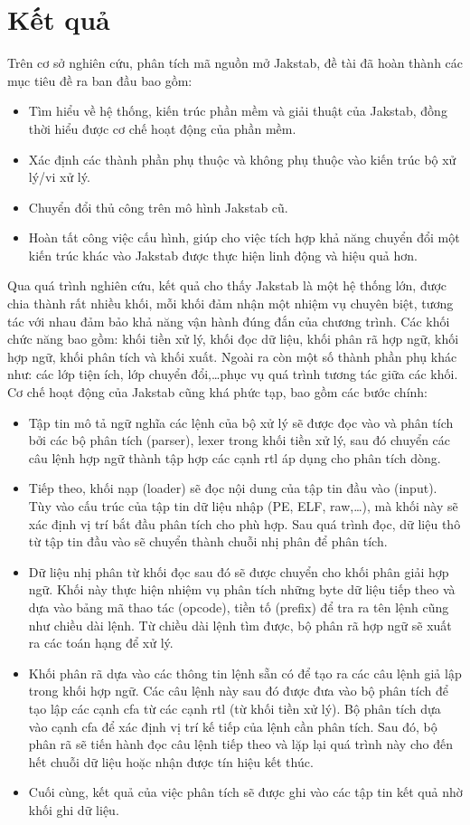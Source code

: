 \section*{Kết quả}
	Trên cơ sở nghiên cứu, phân tích mã nguồn mở Jakstab, đề tài đã hoàn thành các mục tiêu đề ra ban đầu bao gồm:
	\begin{itemize}
		\item Tìm hiểu về hệ thống, kiến trúc phần mềm và giải thuật của Jakstab, đồng thời hiểu được cơ chế hoạt động của phần mềm.
		\item Xác định các thành phần phụ thuộc và không phụ thuộc vào kiến trúc bộ xử lý/vi xử lý.
		\item Chuyển đổi thủ công trên mô hình Jakstab cũ.
		\item Hoàn tất công việc cấu hình, giúp cho việc tích hợp khả năng chuyển đổi một kiến trúc khác vào Jakstab được thực hiện linh động và hiệu quả hơn.
	\end{itemize}
	Qua quá trình nghiên cứu, kết quả cho thấy Jakstab là một hệ thống lớn, được chia thành rất nhiều khối, mỗi khối đảm nhận một nhiệm vụ chuyên biệt, tương tác với nhau đảm bảo khả năng vận hành đúng đắn của chương trình. Các khối chức năng bao gồm: khối tiền xử lý, khối đọc dữ liệu, khối phân rã hợp ngữ, khối hợp ngữ, khối phân tích và khối xuất. Ngoài ra còn một số thành phần phụ khác như: các lớp tiện ích, lớp chuyển đổi,\ldots phục vụ quá trình tương tác giữa các khối. Cơ chế hoạt động của Jakstab cũng khá phức tạp, bao gồm các bước chính:
	\begin{itemize}
		\item Tập tin mô tả ngữ nghĩa các lệnh của bộ xử lý sẽ được đọc vào và phân tích bởi các bộ phân tích (parser), lexer trong khối tiền xử lý, sau đó chuyển các câu lệnh hợp ngữ thành tập hợp các cạnh \acrshort{rtl} áp dụng cho phân tích dòng.
		\item Tiếp theo, khối nạp (loader) sẽ đọc nội dung của tập tin đầu vào (input). Tùy vào cấu trúc của tập tin dữ liệu nhập (PE, ELF, raw,\ldots), mà khối này sẽ xác định vị trí bắt đầu phân tích cho phù hợp. Sau quá trình đọc, dữ liệu thô từ tập tin đầu vào sẽ chuyển thành chuỗi nhị phân để phân tích.
		\item Dữ liệu nhị phân từ khối đọc sau đó sẽ được chuyển cho khối phân giải hợp ngữ. Khối này thực hiện nhiệm vụ phân tích những byte dữ liệu tiếp theo và dựa vào bảng mã thao tác (opcode), tiền tố (prefix) để tra ra tên lệnh cũng như chiều dài lệnh. Từ chiều dài lệnh tìm được, bộ phân rã hợp ngữ sẽ xuất ra các toán hạng để xử lý.
		\item Khối phân rã dựa vào các thông tin lệnh sẵn có để tạo ra các câu lệnh giả lập trong khối hợp ngữ. Các câu lệnh này sau đó được đưa vào bộ phân tích để tạo lập các cạnh \acrshort{cfa} từ các cạnh \acrshort{rtl} (từ khối tiền xử lý). Bộ phân tích dựa vào cạnh \acrshort{cfa} để xác định vị trí kế tiếp của lệnh cần phân tích. Sau đó, bộ phân rã sẽ tiến hành đọc câu lệnh tiếp theo và lặp lại quá trình này cho đến hết chuỗi dữ liệu hoặc nhận được tín hiệu kết thúc.
		\item Cuối cùng, kết quả của việc phân tích sẽ được ghi vào các tập tin kết quả nhờ khối ghi dữ liệu.
	\end{itemize}

